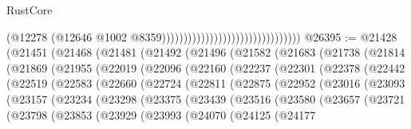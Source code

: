 \begin{lexlean}{RustCore}
\begin{coremodule}
                                                                (@12278
                                                                  (@12646
                                                                    @1002
                                                                    @8359))))))))))))))))))))))))))))))))
@26395 := @21428
    (@21451
      (@21468
        (@21481
          (@21492
            (@21496
              (@21582
                (@21683
                  (@21738
                    (@21814
                      (@21869
                        (@21955
                          (@22019
                            (@22096
                              (@22160
                                (@22237
                                  (@22301
                                    (@22378
                                      (@22442
                                        (@22519
                                          (@22583
                                            (@22660
                                              (@22724
                                                (@22811
                                                  (@22875
                                                    (@22952
                                                      (@23016
                                                        (@23093
                                                          (@23157
                                                            (@23234
                                                              (@23298
                                                                (@23375
                                                                  (@23439
                                                                    (@23516
                                                                      (@23580
                                                                        (@23657
                                                                          (@23721
                                                                            (@23798
                                                                              (@23853
                                                                                (@23929
                                                                                  (@23993
                                                                                    (@24070
                                                                                      (@24125
                                                                                        (@24177

\end{coremodule}
\end{lexlean}
